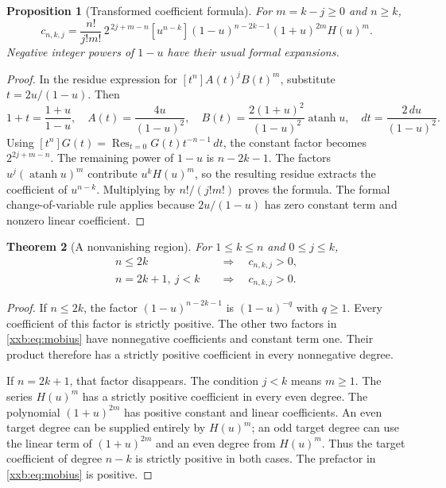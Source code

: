 \documentclass[11pt,a4paper]{article}
\numberwithin{equation}{section}
\newtheorem{theorem}{Theorem}[section]
\newtheorem{proposition}[theorem]{Proposition}
\theoremstyle{definition}
\theoremstyle{remark}
\theoremstyle{plain}
\DeclareMathOperator{\Res}{Res}
\DeclareMathOperator{\atanh}{atanh}
\begin{document}
\begin{proposition}[Transformed coefficient formula]\label{xxb:prop:mobius}
For $m=k-j\ge0$ and $n\ge k$,
\begin{equation}\label{xxb:eq:mobius}
 c_{n,k,j}=\frac{n!}{j!m!}\,2^{\,2j+m-n}
 [u^{n-k}](1-u)^{n-2k-1}(1+u)^{2m}H(u)^m.
\end{equation}
Negative integer powers of $1-u$ have their usual formal expansions.
\end{proposition}
\begin{proof}
In the residue expression for $[t^n]A(t)^jB(t)^m$, substitute
$t=2u/(1-u)$. Then
\[
 1+t=\frac{1+u}{1-u},\quad
 A(t)=\frac{4u}{(1-u)^2},\quad
 B(t)=\frac{2(1+u)^2}{(1-u)^2}\atanh u,
 \quad dt=\frac{2\,du}{(1-u)^2}.
\]
Using $[t^n]G(t)=\Res_{t=0}G(t)t^{-n-1}\,dt$, the constant factor becomes
$2^{2j+m-n}$. The remaining power of $1-u$ is $n-2k-1$.
The factors $u^j(\atanh u)^m$ contribute $u^kH(u)^m$, so the resulting
residue extracts the coefficient of $u^{n-k}$. Multiplying by
$n!/(j!m!)$ proves the formula. The formal change-of-variable rule applies
because $2u/(1-u)$ has zero constant term and nonzero linear coefficient.
\end{proof}

\begin{theorem}[A nonvanishing region]\label{xxb:thm:positive}
For $1\le k\le n$ and $0\le j\le k$,
\begin{equation}\label{xxb:eq:positive}
 \begin{split}
 n\le2k&\quad\Longrightarrow\quad c_{n,k,j}>0,\\
 n=2k+1,\ j<k&\quad\Longrightarrow\quad c_{n,k,j}>0.
 \end{split}
\end{equation}
\end{theorem}
\begin{proof}
If $n\le2k$, the factor $(1-u)^{n-2k-1}$ is $(1-u)^{-q}$ with $q\ge1$.
Every coefficient of this factor is strictly positive. The other two
factors in \eqref{xxb:eq:mobius} have nonnegative coefficients and constant
term one. Their product therefore has a strictly positive coefficient in
every nonnegative degree.

If $n=2k+1$, that factor disappears. The condition $j<k$ means $m\ge1$.
The series $H(u)^m$ has a strictly positive coefficient in every even
degree. The polynomial $(1+u)^{2m}$ has positive constant and linear
coefficients. An even target degree can be supplied entirely by $H(u)^m$;
an odd target degree can use the linear term of $(1+u)^{2m}$ and an even
degree from $H(u)^m$. Thus the target coefficient of degree $n-k$ is
strictly positive in both cases. The prefactor in \eqref{xxb:eq:mobius} is
positive.
\end{proof}
\end{document}
